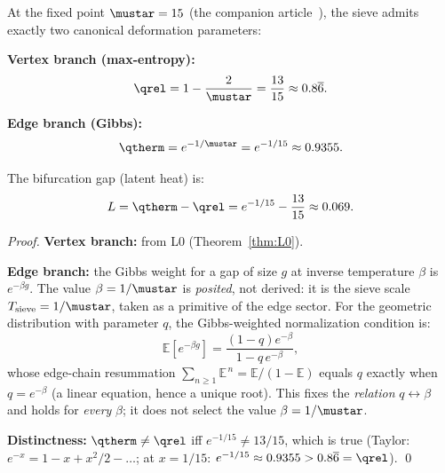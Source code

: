 \documentclass[12pt,a4paper]{article}
\begin{document}
\mTHM
\begin{theorem}
\label{thm:bifurcation}
At the fixed point $\mustar = 15$ (the companion article~\cite{companion_M3}), the sieve admits exactly
two canonical deformation parameters:

\textbf{Vertex branch (max-entropy):}
\begin{equation}
  \qrel = 1 - \frac{2}{\mustar} = \frac{13}{15} \approx 0.8\overline{6}.
  \label{eq:qstat_val}
\end{equation}

\textbf{Edge branch (Gibbs):}
\begin{equation}
  \qtherm = e^{-1/\mustar} = e^{-1/15} \approx 0.9355.
  \label{eq:qtherm_val}
\end{equation}

The bifurcation gap (latent heat) is:
\begin{equation}
  L = \qtherm - \qrel = e^{-1/15} - \frac{13}{15} \approx 0.069.
  \label{eq:latent_heat}
\end{equation}

\begin{proof}
\textbf{Vertex branch:} from L0 (Theorem~\ref{thm:L0}).

\textbf{Edge branch:} the Gibbs weight for a gap of size $g$ at
inverse temperature $\beta$ is $e^{-\beta g}$. The value
$\beta = 1/\mustar$ is \emph{posited}, not derived: it is the sieve
scale $T_{\rm sieve} = 1/\mustar$, taken as a primitive of the edge
sector. For the geometric distribution with parameter $q$, the
Gibbs-weighted normalization condition is:
\[
  \mathbb{E}[e^{-\beta g}] = \frac{(1-q)e^{-\beta}}{1-q\,e^{-\beta}},
\]
whose edge-chain resummation
$\sum_{n\geq 1}\mathbb{E}^{\,n} = \mathbb{E}/(1-\mathbb{E})$ equals $q$
exactly when $q = e^{-\beta}$ (a linear equation, hence a unique root).
This fixes the \emph{relation} $q \leftrightarrow \beta$ and holds for
\emph{every} $\beta$; it does not select the value $\beta = 1/\mustar$.

\textbf{Distinctness:} $\qtherm \neq \qrel$ iff $e^{-1/15} \neq 13/15$,
which is true (Taylor: $e^{-x} = 1 - x + x^2/2 - \ldots$; at $x = 1/15$:
$e^{-1/15} \approx 0.9355 > 0.8\overline{6} = \qrel$). \qed
\end{proof}
\end{theorem}
\end{document}
